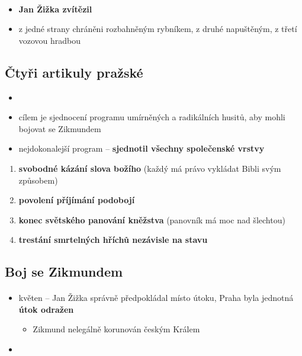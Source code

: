 \paragraph{}
\begin{itemize}
\item \textbf{Jan Žižka zvítězil}
\item z jedné strany chráněni rozbahněným rybníkem, z druhé napuštěným, z třetí vozovou hradbou
\end{itemize}

\subsection{Čtyři artikuly pražské}
\begin{itemize}
\item {}
\item cílem je sjednocení programu umírněných a radikálních husitů, aby mohli bojovat se Zikmundem
\item nejdokonalejší program -- \textbf{sjednotil všechny společenské vrstvy}
\end{itemize}
\begin{enumerate}
\item \textbf{svobodné kázání slova božího} (každý má právo vykládat Bibli svým způsobem)
\item \textbf{povolení příjímání podobojí}
\item \textbf{konec světského panování kněžstva} (panovník má moc nad šlechtou)
\item \textbf{trestání smrtelných hříchů nezávisle na stavu}
\end{enumerate}

\subsection{Boj se Zikmundem}
\paragraph{}
\begin{itemize}
\item květen -- Jan Žižka správně předpokládal místo útoku, Praha byla jednotná \ra\textbf{ útok odražen}
\begin{itemize}
\item Zikmund nelegálně korunován českým Králem
\end{itemize}
\item {}
\end{itemize}

